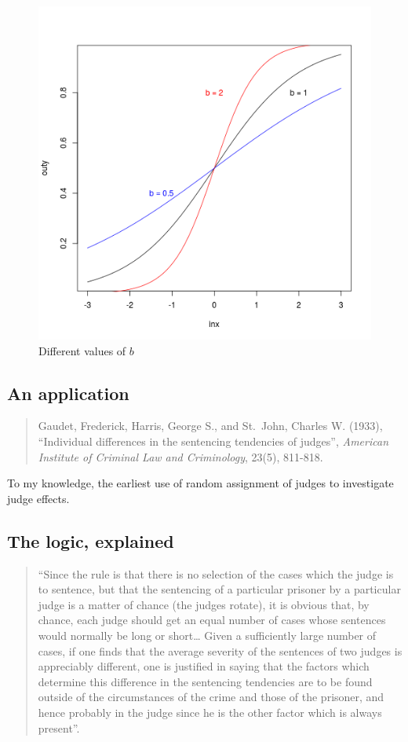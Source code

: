\documentclass[12pt,twoside]{article}
\begin{document}
\begin{figure}[htbp]
\centering
\includegraphics{figure/logitplots2-1.png}
\caption{Different values of \(b\)}
\end{figure}

\subsection{An application}\label{an-application}

\begin{quote}
Gaudet, Frederick, Harris, George S., and St.~John, Charles W. (1933),
``Individual differences in the sentencing tendencies of judges'',
\emph{American Institute of Criminal Law and Criminology}, 23(5),
811-818.
\end{quote}

To my knowledge, the earliest use of random assignment of judges to
investigate judge effects.

\subsection{The logic, explained}\label{the-logic-explained}

\begin{quote}
``Since the rule is that there is no selection of the cases which the
judge is to sentence, but that the sentencing of a particular prisoner
by a particular judge is a matter of chance (the judges rotate), it is
obvious that, by chance, each judge should get an equal number of cases
whose sentences would normally be long or short\ldots{} Given a
sufficiently large number of cases, if one finds that the average
severity of the sentences of two judges is appreciably different, one is
justified in saying that the factors which determine this difference in
the sentencing tendencies are to be found outside of the circumstances
of the crime and those of the prisoner, and hence probably in the judge
since he is the other factor which is always present''.
\end{quote}
\end{document}
